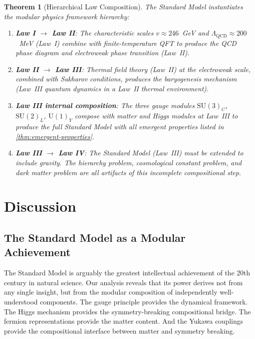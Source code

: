 \documentclass[12pt]{article}
\newtheorem{theorem}{Theorem}[section]
\theoremstyle{definition}
\theoremstyle{remark}
\newcommand{\su}[1]{\mathrm{SU}(#1)}
\newcommand{\uu}[1]{\mathrm{U}(#1)}
\begin{document}
\begin{theorem}[Hierarchical Law Composition]
\label{thm:law-composition}
The Standard Model instantiates the modular physics framework hierarchy:
\begin{enumerate}
\item \textbf{Law I $\to$ Law II}: The characteristic scales $v \approx 246$~GeV and $\Lambda_{\mathrm{QCD}} \approx 200$~MeV (Law~I) combine with finite-temperature QFT to produce the QCD phase diagram and electroweak phase transition (Law~II).
\item \textbf{Law II $\to$ Law III}: Thermal field theory (Law~II) at the electroweak scale, combined with Sakharov conditions, produces the baryogenesis mechanism (Law~III quantum dynamics in a Law~II thermal environment).
\item \textbf{Law III internal composition}: The three gauge modules $\su{3}_C$, $\su{2}_L$, $\uu{1}_Y$ compose with matter and Higgs modules at Law~III to produce the full Standard Model with all emergent properties listed in \cref{thm:emergent-properties}.
\item \textbf{Law III $\to$ Law IV}: The Standard Model (Law~III) must be extended to include gravity. The hierarchy problem, cosmological constant problem, and dark matter problem are all artifacts of this incomplete compositional step.
\end{enumerate}
\end{theorem}


\section{Discussion}
\label{sec:discussion}

\subsection{The Standard Model as a Modular Achievement}

The Standard Model is arguably the greatest intellectual achievement of the 20th century in natural science. Our analysis reveals that its power derives not from any single insight, but from the modular composition of independently well-understood components. The gauge principle provides the dynamical framework. The Higgs mechanism provides the symmetry-breaking compositional bridge. The fermion representations provide the matter content. And the Yukawa couplings provide the compositional interface between matter and symmetry breaking.
\end{document}
